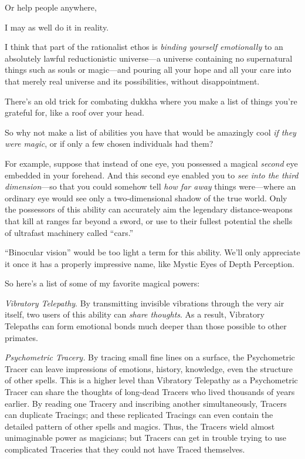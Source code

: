 {
 Or help people anywhere,}

{
 I may as well do it in reality.}

\myendsectiontext


\bigskip


{
 I think that part of the rationalist ethos is \textit{binding
yourself emotionally} to an absolutely lawful reductionistic
universe---a universe containing no supernatural things such as souls
or magic---and pouring all your hope and all your care into that merely
real universe and its possibilities, without disappointment. }

{
 There's an old trick for combating dukkha where
you make a list of things you're grateful for, like a
roof over your head.}

{
 So why not make a list of abilities you have that would be
amazingly cool \textit{if they were magic}, or if only a few chosen
individuals had them?}

{
 For example, suppose that instead of one eye, you possessed a
magical \textit{second} eye embedded in your forehead. And this second
eye enabled you to \textit{see into the third dimension}{}---so that
you could somehow tell \textit{how far away} things were---where an
ordinary eye would see only a two-dimensional shadow of the true world.
Only the possessors of this ability can accurately aim the legendary
distance-weapons that kill at ranges far beyond a sword, or use to
their fullest potential the shells of ultrafast machinery called
``cars.''}

{
 ``Binocular vision'' would be
too light a term for this ability. We'll only
appreciate it once it has a properly impressive name, like Mystic Eyes
of Depth Perception.}

{
 So here's a list of some of my favorite magical
powers:}

{
 \textit{Vibratory Telepathy}. By transmitting invisible vibrations
through the very air itself, two users of this ability can
\textit{share thoughts}. As a result, Vibratory Telepaths can form
emotional bonds much deeper than those possible to other primates.}

{
 \textit{Psychometric Tracery.} By tracing small fine lines on a
surface, the Psychometric Tracer can leave impressions of emotions,
history, knowledge, even the structure of other spells. This is a
higher level than Vibratory Telepathy as a Psychometric Tracer can
share the thoughts of long-dead Tracers who lived thousands of years
earlier. By reading one Tracery and inscribing another simultaneously,
Tracers can duplicate Tracings; and these replicated Tracings can even
contain the detailed pattern of other spells and magics. Thus, the
Tracers wield almost unimaginable power as magicians; but Tracers can
get in trouble trying to use complicated Traceries that they could not
have Traced themselves.}

